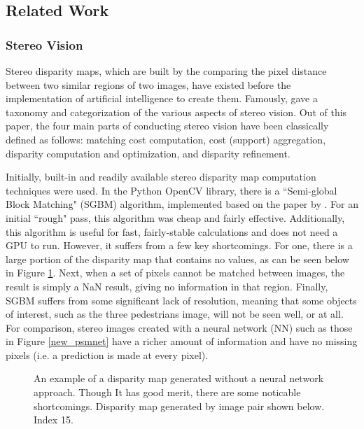 \subsection{Related Work} %

\subsubsection{Stereo Vision}
Stereo disparity maps, which are built by the comparing the pixel distance between two similar regions of two images, have existed before the implementation of artificial intelligence to create them. Famously, \cite{scharstein_taxonomy_2002} gave a taxonomy and categorization of the various aspects of stereo vision. Out of this paper, the four main parts of conducting stereo vision have been classically defined as follows: matching cost computation, cost (support) aggregation, disparity computation and optimization, and disparity refinement.

Initially, built-in and readily available stereo disparity map computation techniques were used. In the Python OpenCV library, there is a ``Semi-global Block Matching" (SGBM) algorithm, implemented based on the paper by \cite{hirschmuller_stereo_2007}. For an initial ``rough" pass, this algorithm was cheap and fairly effective. Additionally, this algorithm is useful for fast, fairly-stable calculations and does not need a GPU to run. However, it suffers from a few key shortcomings. For one, there is a large portion of the disparity map that contains no values, as can be seen below in Figure \ref{ind15_SGBM_comparison}. Next, when a set of pixels cannot be matched between images, the result is simply a NaN result, giving no information in that region. Finally, SGBM suffers from some significant lack of resolution, meaning that some objects of interest, such as the three pedestrians image, will not be seen well, or at all. For comparison, stereo images created with a neural network (NN) such as those in Figure \ref{new_psmnet} have a richer amount of information and have no missing pixels (i.e. a prediction is made at every pixel).

\begin{figure}[H]
    \centering
    \caption{An example of a disparity map generated without a neural network approach. Though It has good merit, there are some noticable shortcomings. Disparity map generated by image pair shown below. Index 15.}
    \label{ind15_SGBM_comparison}
\end{figure}


